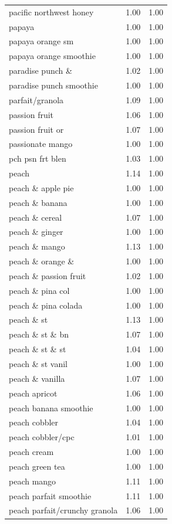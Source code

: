 \begin{table}
\begin{tabular}{lrr}
pacific northwest honey & 1.00 & 1.00 \\
papaya & 1.00 & 1.00 \\
papaya orange sm & 1.00 & 1.00 \\
papaya orange smoothie & 1.00 & 1.00 \\
paradise punch \& & 1.02 & 1.00 \\
paradise punch smoothie & 1.00 & 1.00 \\
parfait/granola & 1.09 & 1.00 \\
passion fruit & 1.06 & 1.00 \\
passion fruit or & 1.07 & 1.00 \\
passionate mango & 1.00 & 1.00 \\
pch psn frt blen & 1.03 & 1.00 \\
peach & 1.14 & 1.00 \\
peach \& apple pie & 1.00 & 1.00 \\
peach \& banana & 1.00 & 1.00 \\
peach \& cereal & 1.07 & 1.00 \\
peach \& ginger & 1.00 & 1.00 \\
peach \& mango & 1.13 & 1.00 \\
peach \& orange \& & 1.00 & 1.00 \\
peach \& passion fruit & 1.02 & 1.00 \\
peach \& pina col & 1.00 & 1.00 \\
peach \& pina colada & 1.00 & 1.00 \\
peach \& st & 1.13 & 1.00 \\
peach \& st \& bn & 1.07 & 1.00 \\
peach \& st \& st & 1.04 & 1.00 \\
peach \& st vanil & 1.00 & 1.00 \\
peach \& vanilla & 1.07 & 1.00 \\
peach apricot & 1.06 & 1.00 \\
peach banana smoothie & 1.00 & 1.00 \\
peach cobbler & 1.04 & 1.00 \\
peach cobbler/cpc & 1.01 & 1.00 \\
peach cream & 1.00 & 1.00 \\
peach green tea & 1.00 & 1.00 \\
peach mango & 1.11 & 1.00 \\
peach parfait smoothie & 1.11 & 1.00 \\
peach parfait/crunchy granola & 1.06 & 1.00 \\

\end{tabular}
\end{table}
